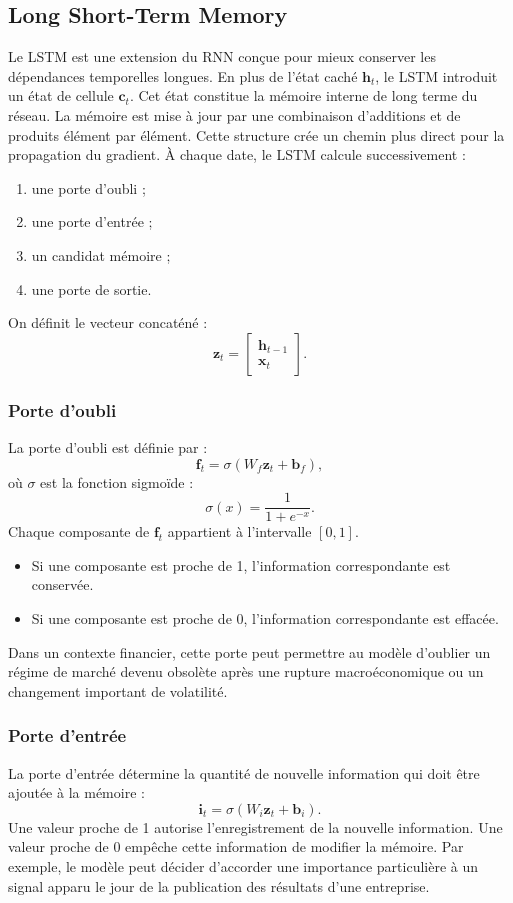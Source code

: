 \documentclass[11pt,a4paper]{article}
\renewcommand{\_}{\usorig\allowbreak}   %
\begin{document}
\subsection{Long Short-Term Memory}
Le LSTM est une extension du RNN conçue pour mieux conserver les dépendances temporelles
longues. En plus de l'état caché $\bm h_t$, le LSTM introduit un état de cellule $\bm c_t$.
Cet état constitue la mémoire interne de long terme du réseau. La mémoire est mise à jour
par une combinaison d'additions et de produits élément par élément. Cette structure crée
un chemin plus direct pour la propagation du gradient. À chaque date, le LSTM calcule
successivement :
\begin{enumerate}[nosep]
  \item une porte d'oubli ;
  \item une porte d'entrée ;
  \item un candidat mémoire ;
  \item une porte de sortie.
\end{enumerate}
On définit le vecteur concaténé :
\[
  \bm z_t = \begin{bmatrix}\bm h_{t-1}\\ \bm x_t\end{bmatrix}.
\]

\subsubsection{Porte d'oubli}
La porte d'oubli est définie par :
\[
  \bm f_t = \sigma\left(W_f\bm z_t + \bm b_f\right),
\]
où $\sigma$ est la fonction sigmoïde :
\[
  \sigma(x) = \frac{1}{1+e^{-x}}.
\]
Chaque composante de $\bm f_t$ appartient à l'intervalle $[0,1]$.
\begin{itemize}[nosep,label=---]
  \item Si une composante est proche de 1, l'information correspondante est conservée.
  \item Si une composante est proche de 0, l'information correspondante est effacée.
\end{itemize}
Dans un contexte financier, cette porte peut permettre au modèle d'oublier un régime de
marché devenu obsolète après une rupture macroéconomique ou un changement important de
volatilité.

\subsubsection{Porte d'entrée}
La porte d'entrée détermine la quantité de nouvelle information qui doit être ajoutée à
la mémoire :
\[
  \bm i_t = \sigma\left(W_i\bm z_t + \bm b_i\right).
\]
Une valeur proche de 1 autorise l'enregistrement de la nouvelle information. Une valeur
proche de 0 empêche cette information de modifier la mémoire. Par exemple, le modèle peut
décider d'accorder une importance particulière à un signal apparu le jour de la
publication des résultats d'une entreprise.
\end{document}
